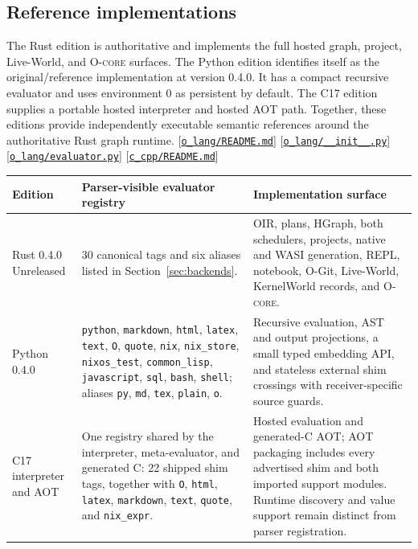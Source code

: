 \documentclass[11pt,oneside]{article}
\newcommand{\ocore}{{\mdseries\textsc{O-core}}}
\newcommand{\src}[1]{\textcolor{OSlate}{\scriptsize[\href{https://github.com/lostadi/OSTADIX/blob/c0b02c326b2329a95ba52447c7180bc93957cd57/#1}{\nolinkurl{#1}}]}\allowbreak}
\begin{document}
\subsection{Reference implementations}

The Rust edition is authoritative and implements the full hosted graph,
project, Live-World, and \ocore{} surfaces. The Python edition identifies
itself as the original/reference implementation at version 0.4.0. It has a
compact recursive evaluator and uses environment 0 as persistent by default.
The C17 edition supplies a portable hosted interpreter and hosted AOT path.
Together, these editions provide independently executable semantic references
around the authoritative Rust graph runtime.
\src{o_lang/README.md}
\src{o_lang/__init__.py}
\src{o_lang/evaluator.py}
\src{c_cpp/README.md}

\begin{longtable}{P{0.18\textwidth} P{0.34\textwidth} P{0.40\textwidth}}
\toprule
\textbf{Edition} & \textbf{Parser-visible evaluator registry} &
\textbf{Implementation surface} \\
\midrule
\endhead
Rust 0.4.0 Unreleased &
30 canonical tags and six aliases listed in Section~\ref{sec:backends}. &
OIR, plans, HGraph, both schedulers, projects, native and WASI generation,
REPL, notebook, O-Git, Live-World, KernelWorld records, and \ocore{}. \\
Python 0.4.0 &
\texttt{python}, \texttt{markdown}, \texttt{html}, \texttt{latex},
\texttt{text}, \texttt{O}, \texttt{quote}, \texttt{nix},
\texttt{nix\_store}, \texttt{nixos\_test}, \texttt{common\_lisp},
\texttt{javascript}, \texttt{sql}, \texttt{bash}, \texttt{shell};
aliases \texttt{py}, \texttt{md}, \texttt{tex}, \texttt{plain}, \texttt{o}. &
Recursive evaluation, AST and output projections, a small typed embedding
API, and stateless external shim crossings with receiver-specific source guards. \\
C17 interpreter and AOT &
One registry shared by the interpreter, meta-evaluator, and generated C:
22 shipped shim tags, together with \texttt{O}, \texttt{html},
\texttt{latex}, \texttt{markdown}, \texttt{text}, \texttt{quote},
and \texttt{nix\_expr}. &
Hosted evaluation and generated-C AOT; AOT packaging includes every
advertised shim and both imported support modules. Runtime discovery and
value support remain distinct from parser registration. \\
\bottomrule
\end{longtable}
\end{document}
